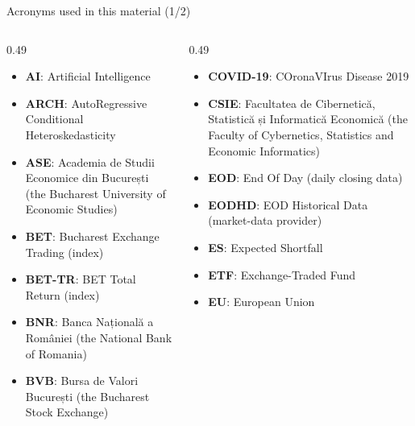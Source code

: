 {
\begin{frame}[noframenumbering]
    \titlepage
\end{frame}
}
\begin{frame}{Acronyms used in this material (1/2)}
\begin{columns}[T]
\begin{column}{0.49\textwidth}
\begin{itemize}\setlength{\itemsep}{0pt}
    \item \textbf{AI}: Artificial Intelligence
    \item \textbf{ARCH}: AutoRegressive Conditional Heteroskedasticity
    \item \textbf{ASE}: Academia de Studii Economice din București (the Bucharest University of Economic Studies)
    \item \textbf{BET}: Bucharest Exchange Trading (index)
    \item \textbf{BET-TR}: BET Total Return (index)
    \item \textbf{BNR}: Banca Națională a României (the National Bank of Romania)
    \item \textbf{BVB}: Bursa de Valori București (the Bucharest Stock Exchange)
\end{itemize}
\end{column}
\begin{column}{0.49\textwidth}
\begin{itemize}\setlength{\itemsep}{0pt}
    \item \textbf{COVID-19}: COronaVIrus Disease 2019
    \item \textbf{CSIE}: Facultatea de Cibernetică, Statistică și Informatică Economică (the Faculty of Cybernetics, Statistics and Economic Informatics)
    \item \textbf{EOD}: End Of Day (daily closing data)
    \item \textbf{EODHD}: EOD Historical Data (market-data provider)
    \item \textbf{ES}: Expected Shortfall
    \item \textbf{ETF}: Exchange-Traded Fund
    \item \textbf{EU}: European Union
\end{itemize}
\end{column}
\end{columns}
\end{frame}
